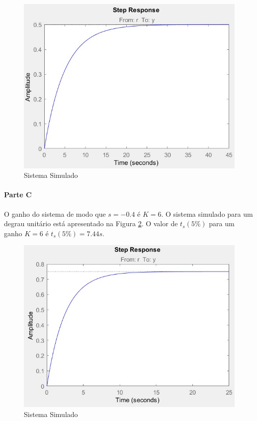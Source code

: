 \documentclass[
]{book}
\theoremstyle{definition}
\theoremstyle{definition}
\theoremstyle{definition}
\theoremstyle{remark}
\begin{document}
\begin{figure}

{\centering \includegraphics{Imagens/Lab8/Resolução/fig1b} 

}

\caption{Sistema Simulado}\label{fig:fig8R3}
\end{figure}

\hypertarget{parte-c-6}{%
\paragraph{Parte C}\label{parte-c-6}}

O ganho do sistema de modo que \(s = -0.4\) é \(K = 6\). O sistema simulado para um degrau unitário está apresentado na Figura \ref{fig:fig81C}. O valor de \(t_s(5\%)\) para um ganho \(K = 6\) é \(t_s(5\%) = 7.44s\).

\begin{figure}

{\centering \includegraphics{Imagens/Lab8/Resolução/fig1c} 

}

\caption{Sistema Simulado}\label{fig:fig81C}
\end{figure}
\end{document}

